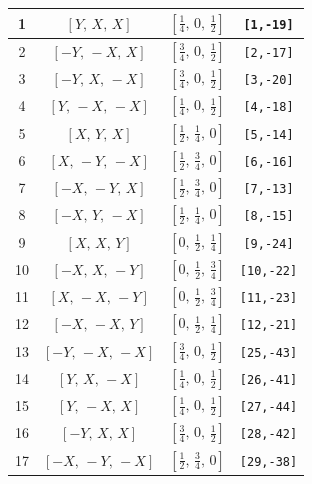 \documentclass[fleqn,8pt]{jsarticle}
\begin{document}
\begin{longtable}{cccc}
1 & $\left[ Y,\, X,\, X \right]$ & $\left[ \frac{1}{4},\, 0,\, \frac{1}{2} \right]$ & {\tt [1,-19]} \\ \hline
2 & $\left[ - Y,\, - X,\, X \right]$ & $\left[ \frac{3}{4},\, 0,\, \frac{1}{2} \right]$ & {\tt [2,-17]} \\ \hline
3 & $\left[ - Y,\, X,\, - X \right]$ & $\left[ \frac{3}{4},\, 0,\, \frac{1}{2} \right]$ & {\tt [3,-20]} \\ \hline
4 & $\left[ Y,\, - X,\, - X \right]$ & $\left[ \frac{1}{4},\, 0,\, \frac{1}{2} \right]$ & {\tt [4,-18]} \\ \hline
5 & $\left[ X,\, Y,\, X \right]$ & $\left[ \frac{1}{2},\, \frac{1}{4},\, 0 \right]$ & {\tt [5,-14]} \\ \hline
6 & $\left[ X,\, - Y,\, - X \right]$ & $\left[ \frac{1}{2},\, \frac{3}{4},\, 0 \right]$ & {\tt [6,-16]} \\ \hline
7 & $\left[ - X,\, - Y,\, X \right]$ & $\left[ \frac{1}{2},\, \frac{3}{4},\, 0 \right]$ & {\tt [7,-13]} \\ \hline
8 & $\left[ - X,\, Y,\, - X \right]$ & $\left[ \frac{1}{2},\, \frac{1}{4},\, 0 \right]$ & {\tt [8,-15]} \\ \hline
9 & $\left[ X,\, X,\, Y \right]$ & $\left[ 0,\, \frac{1}{2},\, \frac{1}{4} \right]$ & {\tt [9,-24]} \\ \hline
10 & $\left[ - X,\, X,\, - Y \right]$ & $\left[ 0,\, \frac{1}{2},\, \frac{3}{4} \right]$ & {\tt [10,-22]} \\ \hline
11 & $\left[ X,\, - X,\, - Y \right]$ & $\left[ 0,\, \frac{1}{2},\, \frac{3}{4} \right]$ & {\tt [11,-23]} \\ \hline
12 & $\left[ - X,\, - X,\, Y \right]$ & $\left[ 0,\, \frac{1}{2},\, \frac{1}{4} \right]$ & {\tt [12,-21]} \\ \hline
13 & $\left[ - Y,\, - X,\, - X \right]$ & $\left[ \frac{3}{4},\, 0,\, \frac{1}{2} \right]$ & {\tt [25,-43]} \\ \hline
14 & $\left[ Y,\, X,\, - X \right]$ & $\left[ \frac{1}{4},\, 0,\, \frac{1}{2} \right]$ & {\tt [26,-41]} \\ \hline
15 & $\left[ Y,\, - X,\, X \right]$ & $\left[ \frac{1}{4},\, 0,\, \frac{1}{2} \right]$ & {\tt [27,-44]} \\ \hline
16 & $\left[ - Y,\, X,\, X \right]$ & $\left[ \frac{3}{4},\, 0,\, \frac{1}{2} \right]$ & {\tt [28,-42]} \\ \hline
17 & $\left[ - X,\, - Y,\, - X \right]$ & $\left[ \frac{1}{2},\, \frac{3}{4},\, 0 \right]$ & {\tt [29,-38]} \\ \hline

\end{longtable}
\end{document}
